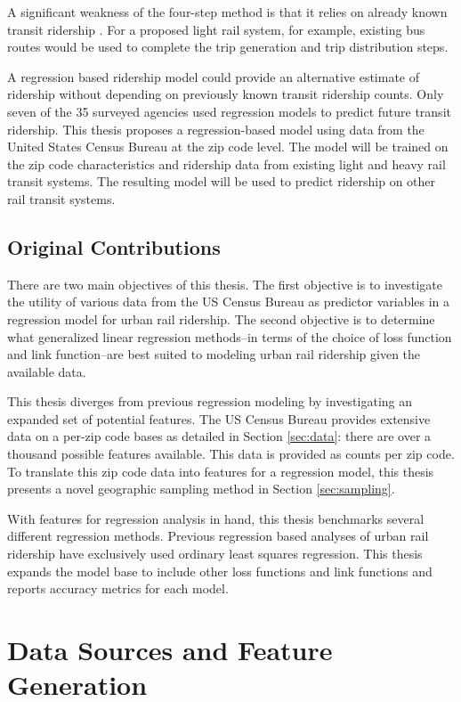 \documentclass[11pt]{article}
\begin{document}
A significant weakness of the four-step method is that it relies on already known transit ridership \cite{NCTR}. For a proposed light rail system, for example, existing bus routes would be used to complete the trip generation and trip distribution steps.

A regression based ridership model could provide an alternative estimate of ridership without depending on previously known transit ridership counts. Only seven of the 35 surveyed agencies used regression models to predict future transit ridership. This thesis proposes a regression-based model using data from the United States Census Bureau at the zip code level. The model will be trained on the zip code characteristics and ridership data from existing light and heavy rail transit systems. The resulting model will be used to predict ridership on other rail transit systems.  

\subsection{Original Contributions}

There are two main objectives of this thesis. The first objective is to investigate the utility of various data from the US Census Bureau as predictor variables in a regression model for urban rail ridership. The second objective is to determine what generalized linear regression methods--in terms of the choice of loss function and link function--are best suited to modeling urban rail ridership given the available data.

This thesis diverges from previous regression modeling by investigating an expanded set of potential features. The US Census Bureau provides extensive data on a per-zip code bases as detailed in Section \ref{sec:data}: there are over a thousand possible features available. This data is provided as counts per zip code. To translate this zip code data into features for a regression model, this thesis presents a novel geographic sampling method in Section \ref{sec:sampling}. 

With features for regression analysis in hand, this thesis benchmarks several different regression methods. Previous regression based analyses of urban rail ridership have exclusively used ordinary least squares regression. This thesis expands the model base to include other loss functions and link functions and reports accuracy metrics for each model. 

\section{Data Sources and Feature Generation}
\end{document}
